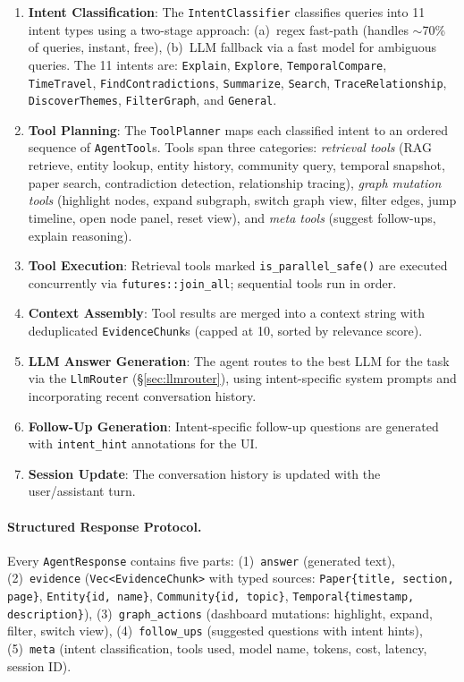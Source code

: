 \documentclass[11pt,a4paper,twocolumn]{article}
\begin{document}
\begin{enumerate}[leftmargin=*]
  \item \textbf{Intent Classification}: The \texttt{IntentClassifier}
    classifies queries into 11 intent types using a two-stage approach:
    (a)~regex fast-path (handles $\sim$70\% of queries, instant, free),
    (b)~LLM fallback via a fast model for ambiguous queries. The 11
    intents are: \texttt{Explain}, \texttt{Explore},
    \texttt{TemporalCompare}, \texttt{TimeTravel},
    \texttt{FindContradictions}, \texttt{Summarize}, \texttt{Search},
    \texttt{TraceRelationship}, \texttt{DiscoverThemes},
    \texttt{FilterGraph}, and \texttt{General}.
  \item \textbf{Tool Planning}: The \texttt{ToolPlanner} maps each
    classified intent to an ordered sequence of \texttt{AgentTool}s.
    Tools span three categories: \emph{retrieval tools} (RAG retrieve,
    entity lookup, entity history, community query, temporal snapshot,
    paper search, contradiction detection, relationship tracing),
    \emph{graph mutation tools} (highlight nodes, expand subgraph,
    switch graph view, filter edges, jump timeline, open node panel,
    reset view), and \emph{meta tools} (suggest follow-ups, explain
    reasoning).
  \item \textbf{Tool Execution}: Retrieval tools marked
    \texttt{is\_parallel\_safe()} are executed concurrently via
    \texttt{futures::join\_all}; sequential tools run in order.
  \item \textbf{Context Assembly}: Tool results are merged into a
    context string with deduplicated \texttt{EvidenceChunk}s
    (capped at 10, sorted by relevance score).
  \item \textbf{LLM Answer Generation}: The agent routes to the
    best LLM for the task via the \texttt{LlmRouter}
    (\S\ref{sec:llmrouter}), using intent-specific system prompts
    and incorporating recent conversation history.
  \item \textbf{Follow-Up Generation}: Intent-specific follow-up
    questions are generated with \texttt{intent\_hint} annotations
    for the UI.
  \item \textbf{Session Update}: The conversation history is updated
    with the user/assistant turn.
\end{enumerate}

\paragraph{Structured Response Protocol.}
Every \texttt{AgentResponse} contains five parts:
(1)~\texttt{answer} (generated text),
(2)~\texttt{evidence} (\texttt{Vec<EvidenceChunk>} with typed sources:
\texttt{Paper\{title, section, page\}}, \texttt{Entity\{id, name\}},
\texttt{Community\{id, topic\}}, \texttt{Temporal\{timestamp,
description\}}),
(3)~\texttt{graph\_actions} (dashboard mutations: highlight, expand,
filter, switch view),
(4)~\texttt{follow\_ups} (suggested questions with intent hints),
(5)~\texttt{meta} (intent classification, tools used, model name,
tokens, cost, latency, session ID).
\end{document}
